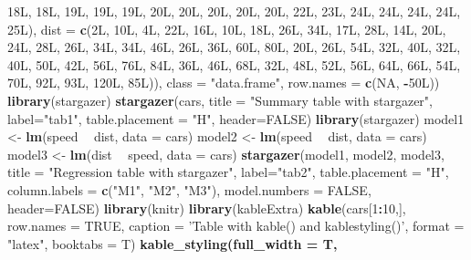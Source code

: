 \documentclass[12pt,]{article}
\newenvironment{Shaded}{\begin{snugshade}}{\end{snugshade}}
\newcommand{\KeywordTok}[1]{\textcolor[rgb]{0.13,0.29,0.53}{\textbf{#1}}}
\newcommand{\DataTypeTok}[1]{\textcolor[rgb]{0.13,0.29,0.53}{#1}}
\newcommand{\DecValTok}[1]{\textcolor[rgb]{0.00,0.00,0.81}{#1}}
\newcommand{\StringTok}[1]{\textcolor[rgb]{0.31,0.60,0.02}{#1}}
\newcommand{\OtherTok}[1]{\textcolor[rgb]{0.56,0.35,0.01}{#1}}
\newcommand{\OperatorTok}[1]{\textcolor[rgb]{0.81,0.36,0.00}{\textbf{#1}}}
\newcommand{\NormalTok}[1]{#1}
\theoremstyle{definition}
\theoremstyle{definition}
\theoremstyle{definition}
\theoremstyle{remark}
\begin{document}
\begin{Shaded}
\begin{Highlighting}[]
\NormalTok{18L, 18L, 19L, 19L, 19L, 20L, 20L, 20L, 20L, 20L, 22L, 23L, 24L, }
\NormalTok{24L, 24L, 24L, 25L), }\DataTypeTok{dist =} \KeywordTok{c}\NormalTok{(2L, 10L, 4L, 22L, 16L, 10L, 18L, }
\NormalTok{26L, 34L, 17L, 28L, 14L, 20L, 24L, 28L, 26L, 34L, 34L, 46L, 26L, }
\NormalTok{36L, 60L, 80L, 20L, 26L, 54L, 32L, 40L, 32L, 40L, 50L, 42L, 56L, }
\NormalTok{76L, 84L, 36L, 46L, 68L, 32L, 48L, 52L, 56L, 64L, 66L, 54L, 70L, }
\NormalTok{92L, 93L, 120L, 85L)), }
\DataTypeTok{class =} \StringTok{"data.frame"}\NormalTok{, }\DataTypeTok{row.names =} \KeywordTok{c}\NormalTok{(}\OtherTok{NA}\NormalTok{, }
\OperatorTok{-}\NormalTok{50L))}
\KeywordTok{library}\NormalTok{(stargazer)}
\KeywordTok{stargazer}\NormalTok{(cars, }
          \DataTypeTok{title =} \StringTok{"Summary table with stargazer"}\NormalTok{,}
          \DataTypeTok{label=}\StringTok{"tab1"}\NormalTok{, }
          \DataTypeTok{table.placement =} \StringTok{"H"}\NormalTok{, }
          \DataTypeTok{header=}\OtherTok{FALSE}\NormalTok{)}
\KeywordTok{library}\NormalTok{(stargazer)}
\NormalTok{model1 <-}\StringTok{ }\KeywordTok{lm}\NormalTok{(speed }\OperatorTok{~}\StringTok{ }\NormalTok{dist, }\DataTypeTok{data =}\NormalTok{ cars)}
\NormalTok{model2 <-}\StringTok{ }\KeywordTok{lm}\NormalTok{(speed }\OperatorTok{~}\StringTok{ }\NormalTok{dist, }\DataTypeTok{data =}\NormalTok{ cars)}
\NormalTok{model3 <-}\StringTok{ }\KeywordTok{lm}\NormalTok{(dist }\OperatorTok{~}\StringTok{ }\NormalTok{speed, }\DataTypeTok{data =}\NormalTok{ cars)}
\KeywordTok{stargazer}\NormalTok{(model1, model2, model3,}
          \DataTypeTok{title =} \StringTok{"Regression table with stargazer"}\NormalTok{,}
          \DataTypeTok{label=}\StringTok{"tab2"}\NormalTok{, }
          \DataTypeTok{table.placement =} \StringTok{"H"}\NormalTok{, }
          \DataTypeTok{column.labels =} \KeywordTok{c}\NormalTok{(}\StringTok{"M1"}\NormalTok{, }\StringTok{"M2"}\NormalTok{, }\StringTok{"M3"}\NormalTok{),}
          \DataTypeTok{model.numbers =} \OtherTok{FALSE}\NormalTok{,}
          \DataTypeTok{header=}\OtherTok{FALSE}\NormalTok{)}
\KeywordTok{library}\NormalTok{(knitr)}
\KeywordTok{library}\NormalTok{(kableExtra)}
\KeywordTok{kable}\NormalTok{(cars[}\DecValTok{1}\OperatorTok{:}\DecValTok{10}\NormalTok{,], }\DataTypeTok{row.names =} \OtherTok{TRUE}\NormalTok{, }
      \DataTypeTok{caption =} \StringTok{'Table with kable() and kablestyling()'}\NormalTok{, }
      \DataTypeTok{format =} \StringTok{"latex"}\NormalTok{, }\DataTypeTok{booktabs =}\NormalTok{ T) }\OperatorTok{%
\StringTok{        }\KeywordTok{kable_styling}\NormalTok{(}\DataTypeTok{full_width =}\NormalTok{ T, }
}
\end{Highlighting}
\end{Shaded}
\end{document}
